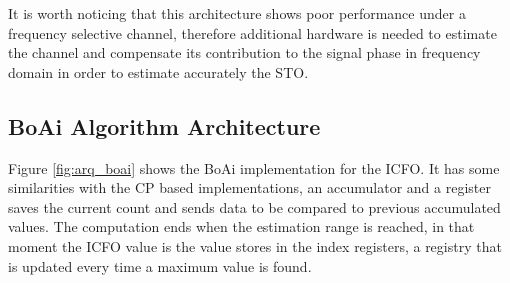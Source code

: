 
It is worth noticing that this architecture shows poor performance under a frequency selective channel, therefore additional hardware is needed to estimate the channel and compensate its contribution to the signal phase in frequency domain in order to estimate accurately the STO. 



\subsection{BoAi Algorithm Architecture}

 Figure \ref{fig:arq_boai} shows the BoAi implementation for the ICFO. It has some similarities with the CP based implementations, an accumulator and a register saves the current count and sends data to be compared to previous accumulated values. The computation ends when the estimation range is reached, in that moment the ICFO value is the value stores in the index registers, a registry that is updated every time a maximum value is found. 

